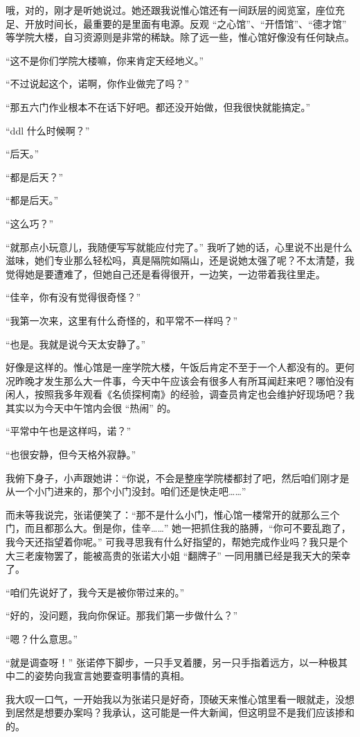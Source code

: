 \documentclass[UTF8]{ctexart}
\begin{document}
哦，对的，刚才是听她说过。她还跟我说惟心馆还有一间跃层的阅览室，座位充足、开放时间长，最重要的是里面有电源。反观 “之心馆”、“开悟馆”、“德才馆” 等学院大楼，自习资源则是非常的稀缺。除了远一些，惟心馆好像没有任何缺点。

“这不是你们学院大楼嘛，你来肯定天经地义。”

“不过说起这个，诺啊，你作业做完了吗？”

“那五六门作业根本不在话下好吧。都还没开始做，但我很快就能搞定。”

“ddl 什么时候啊？”

“后天。”

“都是后天？”

“都是后天。”

“这么巧？”

“就那点小玩意儿，我随便写写就能应付完了。” 我听了她的话，心里说不出是什么滋味，她们专业那么轻松吗，真是隔院如隔山，还是说她太强了呢？不太清楚，我觉得她是要遭难了，但她自己还是看得很开，一边笑，一边带着我往里走。

“佳辛，你有没有觉得很奇怪？”

“我第一次来，这里有什么奇怪的，和平常不一样吗？”

“也是。我就是说今天太安静了。”

好像是这样的。惟心馆是一座学院大楼，午饭后肯定不至于一个人都没有的。更何况昨晚才发生那么大一件事，今天中午应该会有很多人有所耳闻赶来吧？哪怕没有闲人，按照我多年观看《名侦探柯南》的经验，调查员肯定也会维护好现场吧？我其实以为今天中午馆内会很 “热闹” 的。

“平常中午也是这样吗，诺？”

“也很安静，但今天格外寂静。”

我俯下身子，小声跟她讲：“你说，不会是整座学院楼都封了吧，然后咱们刚才是从一个小门进来的，那个小门没封。咱们还是快走吧……”

而未等我说完，张诺便笑了：“那不是什么小门，惟心馆一楼常开的就那么三个门，而且都那么大。倒是你，佳辛……” 她一把抓住我的胳膊，“你可不要乱跑了，我今天还指望着你呢。” 可我寻思我有什么好指望的，帮她完成作业吗？我只是个大三老废物罢了，能被高贵的张诺大小姐 “翻牌子” 一同用膳已经是我天大的荣幸了。

“咱们先说好了，我今天是被你带过来的。”

“好的，没问题，我向你保证。那我们第一步做什么？”

“嗯？什么意思。”

“就是调查呀！” 张诺停下脚步，一只手叉着腰，另一只手指着远方，以一种极其中二的姿势向我宣言她要查明事情的真相。

我大叹一口气，一开始我以为张诺只是好奇，顶破天来惟心馆里看一眼就走，没想到居然是想要办案吗？我承认，这可能是一件大新闻，但这明显不是我们应该掺和的。
\end{document}
